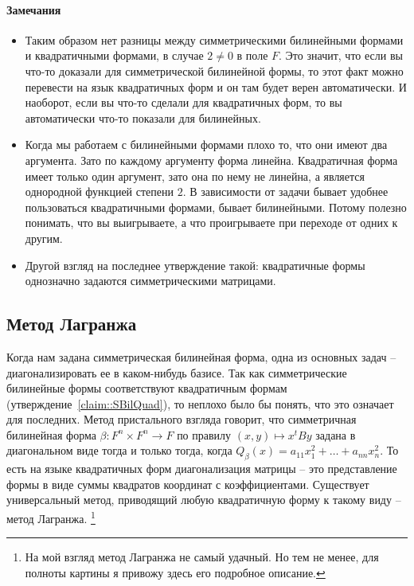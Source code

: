 \paragraph{Замечания}

\begin{itemize}
\item Таким образом нет разницы между симметрическими билинейными формами и квадратичными формами, в случае $2 \neq 0$ в поле $F$.
Это значит, что если вы что-то доказали для симметрической билинейной формы, то этот факт можно перевести на язык квадратичных форм и он там будет верен автоматически.
И наоборот, если вы что-то сделали для квадратичных форм, то вы автоматически что-то показали для билинейных.

\item Когда мы работаем с билинейными формами плохо то, что они имеют два аргумента.
Зато по каждому аргументу форма линейна.
Квадратичная форма имеет только один аргумент, зато она по нему не линейна, а является однородной функцией степени $2$.
В зависимости от задачи бывает удобнее пользоваться квадратичными формами, бывает билинейными.
Потому полезно понимать, что вы выигрываете, а что проигрываете при переходе от одних к другим.

\item Другой взгляд на последнее утверждение такой: квадратичные формы однозначно задаются симметрическими матрицами.

\end{itemize}


\subsection{Метод Лагранжа}

Когда нам задана симметрическая билинейная форма, одна из основных задач -- диагонализировать ее в каком-нибудь базисе.
Так как симметрические билинейные формы соответствуют квадратичным формам (утверждение~\ref{claim::SBilQuad}), то неплохо было бы понять, что это означает для последних.
Метод пристального взгляда говорит, что симметричная билинейная форма $\beta\colon F^n \times F^n \to F$ по правилу $(x, y)\mapsto x^t B y$ задана в диагональном виде тогда и только тогда, когда $Q_\beta(x) = a_{11}x_1^2 + \ldots + a_{nn}x_n^2$.
То есть на языке квадратичных форм диагонализация матрицы -- это представление формы в виде суммы квадратов координат с коэффициентами.
Существует универсальный метод, приводящий любую квадратичную форму к такому виду -- метод Лагранжа.%
\footnote{На мой взгляд метод Лагранжа не самый удачный.
Но тем не менее, для полноты картины я привожу здесь его подробное описание.}

